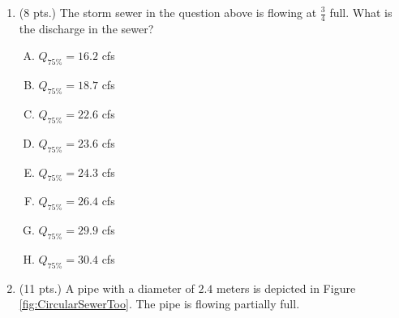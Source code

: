 \documentclass[11pt]{article}
\begin{document}
\begin{enumerate}
\begin{enumerate} [(A)]
\item  $17.8$ cfs
\item  $19.2$ cfs
\item  $20.6$ cfs
\item  $22.1$ cfs
\item  $28.9$ cfs
\item  $31.2$ cfs
\item  $33.4$ cfs
\item  $35.9$ cfs
\end{enumerate}


\clearpage
\item (8 pts.)
The storm sewer in the question above is flowing at $\frac{3}{4}$ full.  What is the discharge in the sewer?
\begin{enumerate} [(A)]
\item  $Q_{75\%} = 16.2 $ cfs
\item  $Q_{75\%} = 18.7$ cfs
\item  $Q_{75\%} = 22.6$ cfs
\item  $Q_{75\%} = 23.6$ cfs
\item $Q_{75\%} = 24.3$ cfs
\item $Q_{75\%} = 26.4$ cfs
\item $Q_{75\%} = 29.9$ cfs
\item $Q_{75\%} = 30.4$ cfs
\end{enumerate}
\item (11 pts.)
 A pipe with a diameter of $2.4$ meters is depicted in Figure \ref{fig:CircularSewerToo}.   The pipe is flowing partially full.


\end{enumerate}
\end{document}

